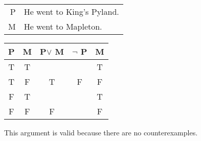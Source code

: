 \begin{tabular}{r l}
    P & He went to King's Pyland. \\
    M & He went to Mapleton.
\end{tabular}

\begin{tabular}{c|c||c|c||c}
    P & M & P$\lor$ M & $\lnot$ P & M \\
    \hline
    T & T &   &   & T \\
    T & F & T & F & F \\
    F & T &   &   & T \\
    F & F & F &   & F
\end{tabular}

\noindent This argument is valid because there are no counterexamples.